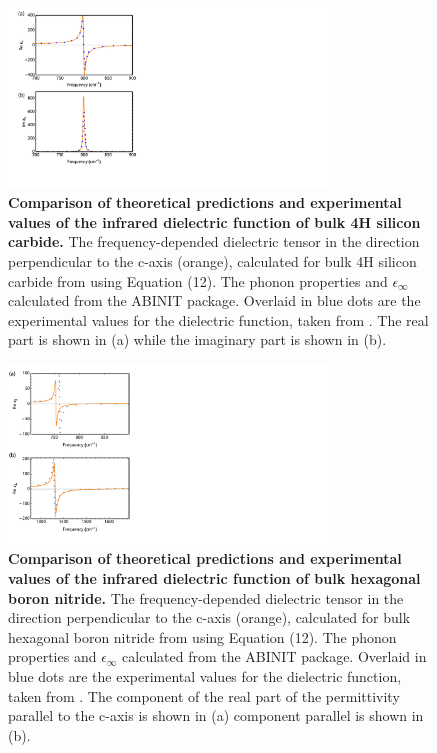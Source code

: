 \documentclass[superscriptaddress,reprint,prb]{revtex4-1}
\begin{document}
\begin{figure}[t]
\includegraphics[width=8.5cm]{SiC_comparison_thy_vs_expt.pdf}
\caption{\textbf{Comparison of theoretical predictions and experimental values of the infrared dielectric function of bulk 4H silicon carbide.} The frequency-depended dielectric tensor in the direction perpendicular to the c-axis (orange), calculated for bulk 4H silicon carbide from using Equation (12). The phonon properties and $\epsilon_{\infty}$ calculated from the ABINIT package. Overlaid in blue dots are the experimental values for the dielectric function, taken from \cite{tiwald1999carrier}. The real part is shown in (a) while the imaginary part is shown in (b). }
\label{fig:epsilon}
\end{figure}

\begin{figure}[t]
\includegraphics[width=8.5cm]{hBN_comparison_thy_vs_expt.pdf}
\caption{\textbf{Comparison of theoretical predictions and experimental values of the infrared dielectric function of bulk hexagonal boron nitride.} The frequency-depended dielectric tensor in the direction perpendicular to the c-axis (orange), calculated for bulk hexagonal boron nitride from using Equation (12). The phonon properties and $\epsilon_{\infty}$ calculated from the ABINIT package. Overlaid in blue dots are the experimental values for the dielectric function, taken from \cite{caldwell2014sub}. The component of the real part of the permittivity parallel to the c-axis is shown in (a) component parallel is shown in (b).}
\label{fig:phonons}
\end{figure}
\end{document}
